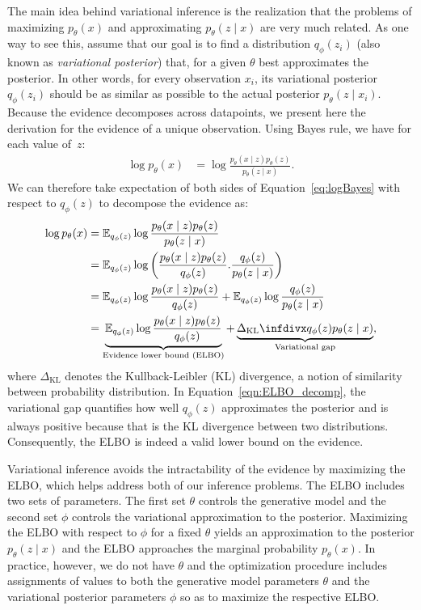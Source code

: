 The main idea behind variational inference is the realization that the problems of maximizing $p_{\theta}(x)$ and approximating $p_{\theta}(z \mid x)$ are very much related. As one way to see this, assume that our goal is to find a distribution $q_{\phi}(z_i)$ (also known as \textit{variational posterior}) that, for a given $\theta$ best approximates the posterior. In other words, for every observation $x_i$, its variational posterior $q_{\phi}(z_i)$ should be as similar as possible to the actual posterior $p_{\theta}(z \mid x_i)$. Because the evidence decomposes across datapoints, we present here the derivation for the evidence of a unique observation. Using Bayes rule, we have for each value of~$z$: 
\begin{align}
    \log p_\theta(x) &= \log \frac{p_\theta(x \mid z)p_\theta(z)}{p_\theta(z \mid x)}.  \label{eq:logBayes} 
\end{align}
We can therefore take expectation of both sides of Equation~\eqref{eq:logBayes} with respect to $q_\phi(z)$ to decompose the evidence as:
\begin{align}
    \log p_\theta(x) &= \mathbb{E}_{q_\phi(z)} \log \frac{p_\theta(x \mid z)p_\theta(z)}{p_\theta(z \mid x)}\\
    &= \mathbb{E}_{q_\phi(z)} \log \left(\frac{p_\theta(x \mid z)p_\theta(z)}{q_\phi(z)}. \frac{q_\phi(z)}{p_\theta(z \mid x)}\right) \\
    &= \mathbb{E}_{q_\phi(z)}\log \frac{p_\theta(x \mid z)p_\theta(z)}{q_\phi(z)} + \mathbb{E}_{q_\phi(z)}\log \frac{q_\phi(z)}{p_\theta(z \mid x)}  \\
    &= \underbrace{\mathbb{E}_{q_\phi(z)} \log \frac{p_\theta(x \mid z)p_\theta(z)}{q_\phi(z)}}_{\text{Evidence lower bound (ELBO)}} +\underbrace{ \kl{q_\phi(z)}{p_\theta(z \mid x)}}_{\text{Variational gap}}, \label{eqn:ELBO_decomp}
\end{align}
where $\Delta_\textrm{KL}$ denotes the Kullback-Leibler (KL) divergence, a notion of similarity between probability distribution. In Equation~\eqref{eqn:ELBO_decomp}, the variational gap quantifies how well $q_\phi(z)$ approximates the posterior and is always positive because that is the KL divergence between two distributions. Consequently, the ELBO is indeed a valid lower bound on the evidence.

Variational inference avoids the intractability of the evidence by maximizing the ELBO, which helps address both of our inference problems. 
The ELBO includes two sets of parameters. The first set $\theta$ controls the generative model and the second set $\phi$ controls the variational approximation to the posterior. Maximizing the ELBO with respect to $\phi$ for a fixed $\theta$ yields an approximation to the posterior $p_\theta(z \mid x)$ and the ELBO approaches the marginal probability $p_{\theta}(x)$. In practice, however, we do not have $\theta$ and the optimization procedure includes assignments of values to both the generative model parameters $\theta$ and the variational posterior parameters $\phi$ so as to maximize the respective ELBO. 



